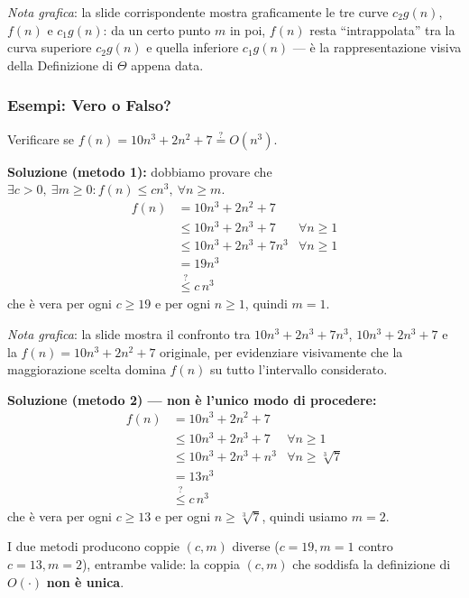 \documentclass[12pt, a4paper]{article}
\begin{document}
\textit{Nota grafica}: la slide corrispondente mostra graficamente le tre curve $c_2 g(n)$, $f(n)$ e $c_1 g(n)$: da un certo punto $m$ in poi, $f(n)$ resta ``intrappolata'' tra la curva superiore $c_2 g(n)$ e quella inferiore $c_1 g(n)$ — è la rappresentazione visiva della Definizione di $\Theta$ appena data.

\subsubsection{Esempi: Vero o Falso?}

\begin{tcolorbox}[colback=lightergray!10, colframe=tocsec, title=\textbf{Esercizio 1}]
Verificare se $f(n) = 10n^3 + 2n^2 + 7 \overset{?}{=} O(n^3)$.
\end{tcolorbox}

\textbf{Soluzione (metodo 1):} dobbiamo provare che $\exists c > 0,\ \exists m \ge 0 : f(n) \le cn^3,\ \forall n \ge m$.
\begin{align*}
f(n) &= 10n^3 + 2n^2 + 7 \\
     &\le 10n^3 + 2n^3 + 7 & \forall n \ge 1 \\
     &\le 10n^3 + 2n^3 + 7n^3 & \forall n \ge 1 \\
     &= 19n^3 \\
     &\overset{?}{\le} c\,n^3
\end{align*}
che è vera per ogni $c \ge 19$ e per ogni $n \ge 1$, quindi $m=1$.

\textit{Nota grafica}: la slide mostra il confronto tra $10n^3+2n^3+7n^3$, $10n^3+2n^3+7$ e la $f(n)=10n^3+2n^2+7$ originale, per evidenziare visivamente che la maggiorazione scelta domina $f(n)$ su tutto l'intervallo considerato.

\textbf{Soluzione (metodo 2) --- non è l'unico modo di procedere:}
\begin{align*}
f(n) &= 10n^3 + 2n^2 + 7 \\
     &\le 10n^3 + 2n^3 + 7 & \forall n \ge 1 \\
     &\le 10n^3 + 2n^3 + n^3 & \forall n \ge \sqrt[3]{7} \\
     &= 13n^3 \\
     &\overset{?}{\le} c\,n^3
\end{align*}
che è vera per ogni $c \ge 13$ e per ogni $n \ge \sqrt[3]{7}$, quindi usiamo $m=2$.

\begin{tcolorbox}[colback=lightergray!5, colframe=tocsubsec, title=\textbf{Osservazione}]
I due metodi producono coppie $(c,m)$ diverse ($c=19, m=1$ contro $c=13, m=2$), entrambe valide: la coppia $(c,m)$ che soddisfa la definizione di $O(\cdot)$ \textbf{non è unica}.
\end{tcolorbox}
\end{document}
